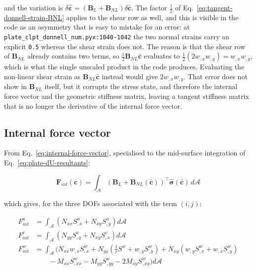 \noindent and the variation is $\delta \hat{\boldsymbol{\varepsilon}} = (\boldsymbol{B}_L + \boldsymbol{B}_{NL}) \delta\bar{\boldsymbol{c}}$. The factor $\frac{1}{2}$ of Eq.~\ref{eq:tangent-donnell-strain-BNL} applies to the shear row as well, and this is visible in the code as an asymmetry that is easy to mistake for an error: at \texttt{plate\_clpt\_donnell\_num.pyx:1040-1042} the two normal strains carry an explicit \texttt{0.5} whereas the shear strain does not. The reason is that the shear row of $\boldsymbol{B}_{NL}$ already contains two terms, so $\frac{1}{2}\boldsymbol{B}_{NL}\bar{\boldsymbol{c}}$ evaluates to $\frac{1}{2}(2 w_{,x} w_{,y}) = w_{,x}w_{,y}$, which is what the single unscaled product in the code produces. Evaluating the non-linear shear strain as $\boldsymbol{B}_{NL}\bar{\boldsymbol{c}}$ instead would give $2 w_{,x} w_{,y}$. That error does not show in $\boldsymbol{B}_{NL}$ itself, but it corrupts the stress state, and therefore the internal force vector and the geometric stiffness matrix, leaving a tangent stiffness matrix that is no longer the derivative of the internal force vector.

\subsection{Internal force vector}\label{sec:tangent-donnell-fint}

From Eq.~\ref{eq:internal-force-vector}, specialised to the mid-surface integration of Eq.~\ref{eq:plate-dU-resultants}:

\begin{equation}\label{eq:tangent-donnell-fint}
	\boldsymbol{F}_{int}(\bar{\boldsymbol{c}}) = \int_{\mathcal{A}} \left( \boldsymbol{B}_L + \boldsymbol{B}_{NL}(\bar{\boldsymbol{c}}) \right)^\top \hat{\boldsymbol{\sigma}}(\bar{\boldsymbol{c}}) \, d\mathcal{A}
\end{equation}

\noindent which gives, for the three DOFs associated with the term $(i,j)$:

\begin{equation}\label{eq:tangent-donnell-fint-rows}
	\begin{aligned}
		F_{int}^{u} &= \int_{\mathcal{A}} \left( N_{xx} S^u_{,x} + N_{xy} S^u_{,y} \right) d\mathcal{A} \\
		F_{int}^{v} &= \int_{\mathcal{A}} \left( N_{yy} S^v_{,y} + N_{xy} S^v_{,x} \right) d\mathcal{A} \\
		F_{int}^{w} &= \int_{\mathcal{A}} \Big( N_{xx} w_{,x} S^w_{,x} + N_{yy} \left( \tfrac{1}{r} S^w + w_{,y} S^w_{,y} \right) + N_{xy} \left( w_{,y} S^w_{,x} + w_{,x} S^w_{,y} \right) \\
		&\qquad - M_{xx} S^w_{,xx} - M_{yy} S^w_{,yy} - 2 M_{xy} S^w_{,xy} \Big) d\mathcal{A}
	\end{aligned}
\end{equation}

